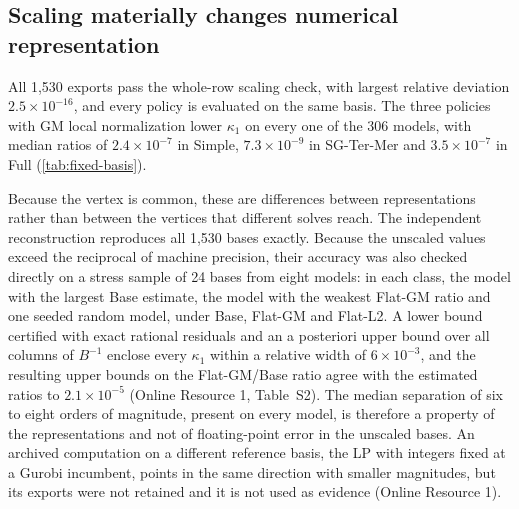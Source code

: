 \documentclass[smallextended,envcountsect,envcountsame]{svjour3}
\begin{document}
\subsection{Scaling materially changes numerical representation}
\label{subsec:results-fixed-basis}
All 1,530 exports pass the whole-row scaling check, with largest relative deviation
$2.5\times10^{-16}$, and every policy is evaluated on the same basis. The three policies with GM
local normalization lower $\kappa_1$ on every one of the 306 models, with median ratios of
$2.4\times10^{-7}$ in Simple, $7.3\times10^{-9}$ in SG-Ter-Mer and $3.5\times10^{-7}$ in Full
(\cref{tab:fixed-basis}).
\begin{table}[tb]
\centering\small
\caption{Fixed-basis conditioning audit on all 306 dispatch models. One optimal basis of the
Base LP relaxation is assembled from every policy's own export. The first row is the median
$\kappa_1$ of the Base basis; the others give the median per-instance ratio
$\kappa_1(\text{policy})/\kappa_1(\text{Base})$ and, in parentheses, the number of instances
with a ratio below one. Ranges are in Online Resource 1, Table~S1.}
\label{tab:fixed-basis}
\resizebox{\textwidth}{!}{}
\end{table} Because the vertex is common, these are differences between
representations rather than between the vertices that different solves reach. The independent
reconstruction reproduces all 1,530 bases exactly. Because the unscaled values exceed the
reciprocal of machine precision, their accuracy was also checked directly on a stress sample of
24 bases from eight models: in each class, the model with the largest Base estimate, the model
with the weakest Flat-GM ratio and one seeded random model, under Base, Flat-GM and Flat-L2. A
lower bound certified with exact rational residuals and an a posteriori upper bound over all
columns of $B^{-1}$ enclose every $\kappa_1$ within a relative width of $6\times10^{-3}$, and the
resulting upper bounds on the Flat-GM/Base ratio agree with the estimated ratios to
$2.1\times10^{-5}$ (Online Resource 1, Table~S2). The median separation of six to eight orders
of magnitude, present on every model, is therefore a property of the representations and not
of floating-point error in the unscaled bases.
An archived computation on a different reference basis, the LP with integers fixed at a Gurobi
incumbent, points in the same direction with smaller magnitudes, but its exports were not
retained and it is not used as evidence (Online Resource 1).
\end{document}
